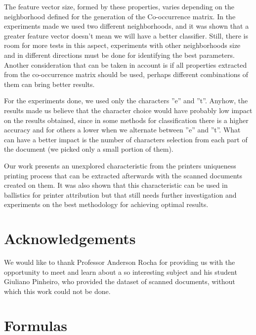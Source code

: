 \documentclass[10pt,twocolumn,letterpaper]{article}
\begin{document}
The feature vector size, formed by these properties, varies depending on the neighborhood defined for the generation of the Co-occurrence matrix. In the experiments made we used two different neighborhoods, and it was shown that a greater feature vector doesn’t mean we will have a better classifier. Still, there is room for more tests in this aspect, experiments with other neighborhoods size and in different directions must be done for identifying the best parameters. Another consideration that can be taken in account is if all properties extracted from the co-occurrence matrix should be used, perhaps different combinations of them can bring better results.

For the experiments done, we used only the characters ''e'' and ''t''. Anyhow, the results made us believe that the character choice would have probably low impact on the results obtained, since in some methods for classification there is a higher accuracy and for others a lower when we alternate between ''e'' and ''t''. What can have a better impact is the number of characters selection from each part of the document (we picked only a small portion of them).

Our work presents an unexplored characteristic from the printers uniqueness printing process that can be extracted afterwards with the scanned documents created on them. It was also shown that this characteristic can be used in ballistics for printer attribution but that still needs further investigation and experiments on the best methodology for achieving optimal results.

\section{Acknowledgements}
\label{sec:acknownledgements}

We would like to thank Professor Anderson Rocha for providing us with the opportunity to meet and learn about a so interesting subject and his student Giuliano Pinheiro, who provided the dataset of scanned documents, without which this work could not be done.

{\small


}

\newpage

\appendix
\label{app:Appendix A}

\section{Formulas}
\end{document}
